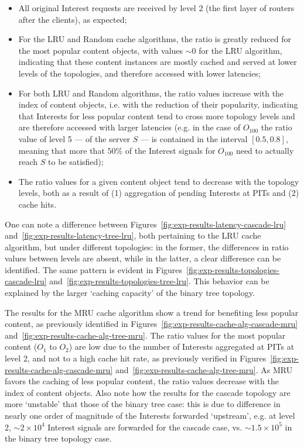 \begin{itemize}
    \item All original Interest requests are 
        received by level 2 (the first layer of routers after the clients), as expected;
    \item For the LRU and Random cache algorithms, the ratio is greatly reduced for 
        the most popular content objects, with values $\sim0$ for the LRU algorithm, 
        indicating that these content instances are mostly cached and served at 
        lower levels of the topologies, and therefore accessed with lower latencies;
    \item For both LRU and Random algorithms, the ratio values increase with the index of 
        content objects, i.e. with the reduction of their popularity, indicating that 
        Interests for less popular content tend to cross more topology levels and 
        are therefore accessed with larger latencies (e.g. in the case of $O_{100}$ 
        the ratio value of level 5 --- of the server $S$ --- is contained in the 
        interval $[0.5, 0.8]$, meaning 
        that more that $50\%$ of the Interest signals for $O_{100}$ need to actually 
        reach $S$ to be satisfied);
    \item The ratio values for a given content object tend to decrease with the topology 
        levels, both as a result of (1) aggregation of pending Interests at PITs and 
        (2) cache hits.
\end{itemize}\shortvertbreak

One can note a difference between Figures~\ref{fig:exp-results-latency-cascade-lru} 
and~\ref{fig:exp-results-latency-tree-lru}, both pertaining to the LRU cache 
algorithm, but under different topologies: in the former, the differences in 
ratio values between levels are absent, while in the latter, a clear difference 
can be identified. The same pattern is evident in 
Figures~\ref{fig:exp-results-topologies-cascade-lru} and~\ref{fig:exp-results-topologies-tree-lru}. 
This behavior can be explained by the larger `caching capacity' of the binary 
tree topology.\shortvertbreak

The results for the MRU cache algorithm show a trend for benefiting less 
popular content, as previously identified in Figures~\ref{fig:exp-results-cache-alg-cascade-mru} 
and~\ref{fig:exp-results-cache-alg-tree-mru}. The ratio values for the 
most popular content ($O_1$ to $O_2$) are low due to the number of Interests aggregated 
at PITs at level 2, and not to a high cache hit rate, as previously verified 
in Figures~\ref{fig:exp-results-cache-alg-cascade-mru} 
and~\ref{fig:exp-results-cache-alg-tree-mru}. As MRU favors the caching of less popular 
content, the ratio values decrease with the index of content objects. Also note how the 
results for the cascade topology are more `unstable' that those of the binary 
tree case: this is due to difference in nearly one order of magnitude of the 
Interests forwarded `upstream', e.g. at level 2, $\sim2 \times 10^4$ Interest signals 
are forwarded for the cascade case, vs. $\sim1.5 \times 10^5$ in the binary 
tree topology case.\shortvertbreak


